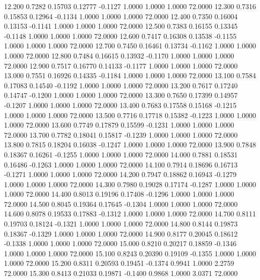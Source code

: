   12.200   0.7282   0.15703   0.12777  -0.1127   1.0000   1.0000   1.0000  72.0000
  12.300   0.7316   0.15853   0.12964  -0.1134   1.0000   1.0000   1.0000  72.0000
  12.400   0.7350   0.16004   0.13153  -0.1141   1.0000   1.0000   1.0000  72.0000
  12.500   0.7383   0.16155   0.13345  -0.1148   1.0000   1.0000   1.0000  72.0000
  12.600   0.7417   0.16308   0.13538  -0.1155   1.0000   1.0000   1.0000  72.0000
  12.700   0.7450   0.16461   0.13734  -0.1162   1.0000   1.0000   1.0000  72.0000
  12.800   0.7484   0.16615   0.13932  -0.1170   1.0000   1.0000   1.0000  72.0000
  12.900   0.7517   0.16770   0.14133  -0.1177   1.0000   1.0000   1.0000  72.0000
  13.000   0.7551   0.16926   0.14335  -0.1184   1.0000   1.0000   1.0000  72.0000
  13.100   0.7584   0.17083   0.14540  -0.1192   1.0000   1.0000   1.0000  72.0000
  13.200   0.7617   0.17240   0.14747  -0.1200   1.0000   1.0000   1.0000  72.0000
  13.300   0.7650   0.17399   0.14957  -0.1207   1.0000   1.0000   1.0000  72.0000
  13.400   0.7683   0.17558   0.15168  -0.1215   1.0000   1.0000   1.0000  72.0000
  13.500   0.7716   0.17718   0.15382  -0.1223   1.0000   1.0000   1.0000  72.0000
  13.600   0.7749   0.17879   0.15599  -0.1231   1.0000   1.0000   1.0000  72.0000
  13.700   0.7782   0.18041   0.15817  -0.1239   1.0000   1.0000   1.0000  72.0000
  13.800   0.7815   0.18204   0.16038  -0.1247   1.0000   1.0000   1.0000  72.0000
  13.900   0.7848   0.18367   0.16261  -0.1255   1.0000   1.0000   1.0000  72.0000
  14.000   0.7881   0.18531   0.16486  -0.1263   1.0000   1.0000   1.0000  72.0000
  14.100   0.7914   0.18696   0.16713  -0.1271   1.0000   1.0000   1.0000  72.0000
  14.200   0.7947   0.18862   0.16943  -0.1279   1.0000   1.0000   1.0000  72.0000
  14.300   0.7980   0.19028   0.17174  -0.1287   1.0000   1.0000   1.0000  72.0000
  14.400   0.8013   0.19196   0.17408  -0.1296   1.0000   1.0000   1.0000  72.0000
  14.500   0.8045   0.19364   0.17645  -0.1304   1.0000   1.0000   1.0000  72.0000
  14.600   0.8078   0.19533   0.17883  -0.1312   1.0000   1.0000   1.0000  72.0000
  14.700   0.8111   0.19703   0.18124  -0.1321   1.0000   1.0000   1.0000  72.0000
  14.800   0.8144   0.19873   0.18367  -0.1329   1.0000   1.0000   1.0000  72.0000
  14.900   0.8177   0.20045   0.18612  -0.1338   1.0000   1.0000   1.0000  72.0000
  15.000   0.8210   0.20217   0.18859  -0.1346   1.0000   1.0000   1.0000  72.0000
  15.100   0.8243   0.20390   0.19109  -0.1355   1.0000   1.0000   1.0000  72.0000
  15.200   0.8311   0.20593   0.19451  -0.1374   0.9941   1.0000   2.2759  72.0000
  15.300   0.8413   0.21033   0.19871  -0.1400   0.9868   1.0000   3.0371  72.0000
